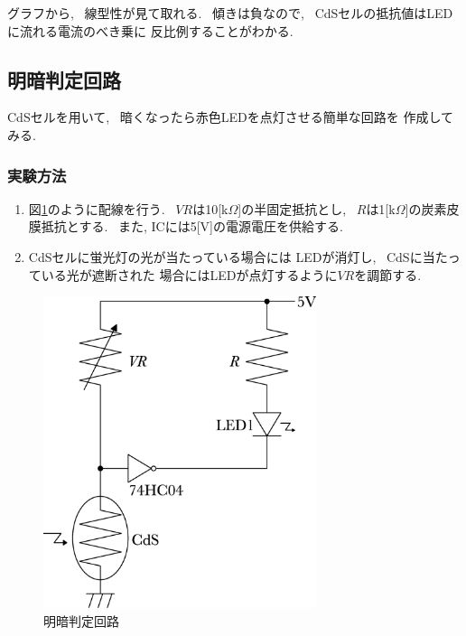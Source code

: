 \documentclass[titlepage]{jsarticle}
\begin{document}
            グラフから, ~線型性が見て取れる.
            ~傾きは負なので, ~CdSセルの抵抗値はLEDに流れる電流のべき乗に
            反比例することがわかる.

    \subsection{明暗判定回路} \label{明暗判定回路}
        CdSセルを用いて, ~暗くなったら赤色LEDを点灯させる簡単な回路を
        作成してみる.

        \subsubsection{実験方法}
            \begin{enumerate}
                \item 図\ref{fig:判定回路}のように配線を行う.
                    ~$VR$は10[k$\Omega$]の半固定抵抗とし,
                    ~$R$は1[k$\Omega$]の炭素皮膜抵抗とする.
                    ~また, ICには5[V]の電源電圧を供給する.
                \item CdSセルに蛍光灯の光が当たっている場合には
                    LEDが消灯し, ~CdSに当たっている光が遮断された
                    場合にはLEDが点灯するように$VR$を調節する.
            \end{enumerate}

            \begin{figure}[ht]
                \centering
                \includegraphics[width=8cm]{images/hanteikairo.eps}
                \caption{明暗判定回路}
                \label{fig:判定回路}
            \end{figure}
\end{document}
